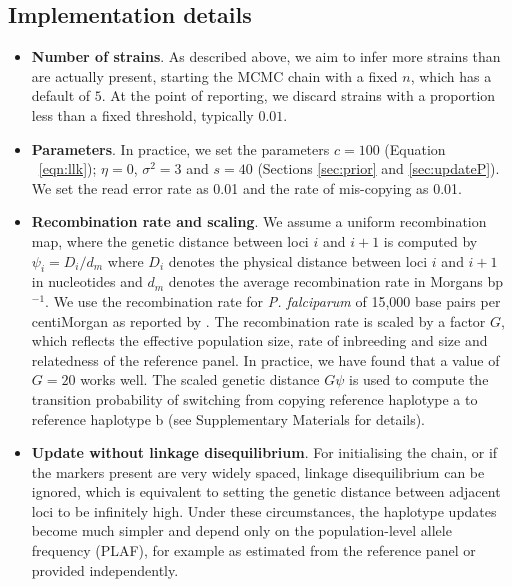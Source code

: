 \documentclass{bioinfo}
\begin{document}
\subsection{Implementation details}

\begin{itemize}
\item {\bf Number of strains}. As described above, we aim to infer more strains than are actually present, starting the MCMC chain with a fixed $n$, which has a default of $5$. At the point of reporting, we discard strains with a proportion less than a fixed threshold, typically $0.01$.

\item {\bf Parameters}. In practice, we set the parameters $c=100$ (Equation ~\eqref{eqn:llk}); $\eta = 0$, $\sigma^2 = 3$ and $s=40$ (Sections \ref{sec:prior} and \ref{sec:updateP}).  We set the read error rate as 0.01 and the rate of mis-copying as 0.01.

\item {\bf Recombination rate and scaling}. We assume a uniform recombination map, where the genetic distance between loci $i$ and $i+1$ is computed by $\psi_i = D_i / d_m$ where $D_i$ denotes the physical distance between loci $i$ and $i+1$ in nucleotides and $d_m$ denotes the average recombination rate in Morgans bp$^{-1}$. We use the recombination rate for {\it P. falciparum} of 15,000 base pairs per centiMorgan as reported by \citet{Miles2016}. The recombination rate is scaled by a factor $G$, which reflects the effective population size, rate of inbreeding and size and relatedness of the reference panel.  In practice, we have found that a value of $G=20$  works well.  The scaled genetic distance $G\psi$ is used to compute the transition probability of switching from copying reference haplotype a to reference haplotype b (see Supplementary Materials for details).

\item {\bf Update without linkage disequilibrium}. For initialising the chain, or if the markers present are very widely spaced, linkage disequilibrium can be ignored, which is equivalent to setting the genetic distance between adjacent loci to be infinitely high.  Under these circumstances, the haplotype updates become much simpler and depend only on the population-level allele frequency (PLAF), for example as estimated from the reference panel or provided independently.


\end{itemize}
\end{document}
